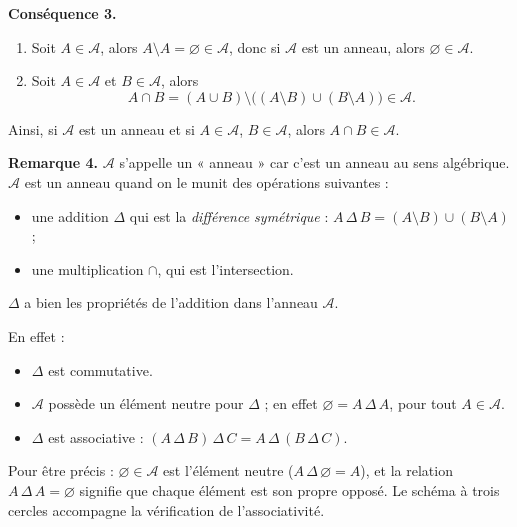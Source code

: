 \documentclass[11pt,a4paper]{article}
\newcommand{\A}{\mathscr{A}}
\begin{document}
\textbf{\color{bleu}Conséquence 3.}
\begin{enumerate}[label=\textbf{\arabic*)},leftmargin=1.2cm]
  \item Soit $A\in\A$, alors $A\setminus A=\varnothing\in\A$, donc si $\A$ est un anneau, alors $\varnothing\in\A$.
  \item Soit $A\in\A$ et $B\in\A$, alors
  \[
    A\cap B=(A\cup B)\setminus\bigl((A\setminus B)\cup(B\setminus A)\bigr)\in\A .
  \]
\end{enumerate}
Ainsi, si $\A$ est un anneau et si $A\in\A$, $B\in\A$, alors $A\cap B\in\A$.

\textbf{\color{bleu}Remarque 4.}
$\A$ s'appelle un « anneau » car c'est un anneau au sens algébrique.
$\A$ est un anneau quand on le munit des opérations suivantes :
\begin{itemize}[leftmargin=1.2cm]
  \item une addition $\Delta$ qui est la \emph{différence symétrique} :
        $A\,\Delta\, B=(A\setminus B)\cup(B\setminus A)$ ;
  \item une multiplication $\cap$, qui est l'intersection.
\end{itemize}
$\Delta$ a bien les propriétés de l'addition dans l'anneau $\A$.

\begin{center}
\end{center}

En effet :
\begin{itemize}[leftmargin=1.2cm]
  \item $\Delta$ est commutative.
  \item $\A$ possède un élément neutre pour $\Delta$ ; en effet $\varnothing=A\,\Delta\,A$, pour tout $A\in\A$.
  \item $\Delta$ est associative : $(A\,\Delta\, B)\,\Delta\, C=A\,\Delta\,(B\,\Delta\, C)$.
\end{itemize}

\begin{note}
Pour être précis : $\varnothing\in\A$ est l'élément neutre ($A\,\Delta\,\varnothing=A$), et la relation
$A\,\Delta\,A=\varnothing$ signifie que chaque élément est son propre opposé. Le schéma à trois cercles
accompagne la vérification de l'associativité.
\end{note}
\end{document}
